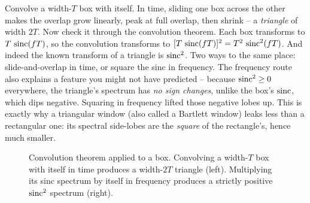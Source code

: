 \begin{example}
\label{ch11:ex-box-box}
Convolve a width-$T$ box with itself. In time, sliding one box across the other
makes the overlap grow linearly, peak at full overlap, then shrink -- a
\emph{triangle} of width $2T$. Now check it through the convolution theorem.
Each box transforms to $T\,\operatorname{sinc}(fT)$, so the convolution transforms to
$[T\,\operatorname{sinc}(fT)]^2 = T^2\,\operatorname{sinc}^2(fT)$. And indeed the known transform of a
triangle is $\operatorname{sinc}^2$. Two ways to the same place: slide-and-overlap in time, or
square the sinc in frequency. The frequency route also explains a feature you
might not have predicted -- because $\operatorname{sinc}^2 \ge 0$ everywhere, the triangle's
spectrum has \emph{no sign changes}, unlike the box's $\operatorname{sinc}$, which dips
negative. Squaring in frequency lifted those negative lobes up. This is exactly why a triangular window (also called a Bartlett window) leaks less than a rectangular one: its
spectral side-lobes are the \emph{square} of the rectangle's, hence much smaller.

\begin{figure}[H]
\centering
{}
\quad
{}
\caption{Convolution theorem applied to a box. Convolving a width-$T$ box with itself in time produces a width-$2T$ triangle (left). Multiplying its sinc spectrum by itself in frequency produces a strictly positive $\operatorname{sinc}^2$ spectrum (right).}
\label{ch11:fig-box-box}
\end{figure}
\end{example}

